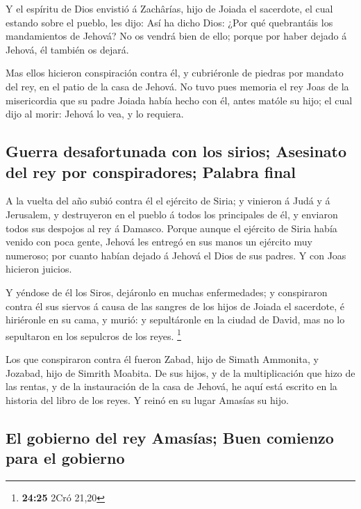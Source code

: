  Y el espíritu de Dios envistió á Zachârías, hijo de Joiada
el sacerdote, el cual estando sobre el pueblo, les dijo: Así ha dicho
Dios: ¿Por qué quebrantáis los mandamientos de Jehová? No os vendrá bien
de ello; porque por haber dejado á Jehová, él también os dejará.

 Mas ellos hicieron conspiración contra él, y cubriéronle
de piedras por mandato del rey, en el patio de la casa de Jehová.
 No tuvo pues memoria el rey Joas de la misericordia que su
padre Joiada había hecho con él, antes matóle su hijo; el cual dijo al
morir: Jehová lo vea, y lo requiera.

\hypertarget{guerra-desafortunada-con-los-sirios-asesinato-del-rey-por-conspiradores-palabra-final}{%
\subsection{Guerra desafortunada con los sirios; Asesinato del rey por
conspiradores; Palabra
final}\label{guerra-desafortunada-con-los-sirios-asesinato-del-rey-por-conspiradores-palabra-final}}

 A la vuelta del año subió contra él el ejército de Siria;
y vinieron á Judá y á Jerusalem, y destruyeron en el pueblo á todos los
principales de él, y enviaron todos sus despojos al rey á Damasco.
 Porque aunque el ejército de Siria había venido con poca
gente, Jehová les entregó en sus manos un ejército muy numeroso; por
cuanto habían dejado á Jehová el Dios de sus padres. Y con Joas hicieron
juicios.

 Y yéndose de él los Siros, dejáronlo en muchas
enfermedades; y conspiraron contra él sus siervos á causa de las sangres
de los hijos de Joiada el sacerdote, é hiriéronle en su cama, y murió: y
sepultáronle en la ciudad de David, mas no lo sepultaron en los
sepulcros de los reyes. \footnote{\textbf{24:25} 2Cró 21,20}

 Los que conspiraron contra él fueron Zabad, hijo de Simath
Ammonita, y Jozabad, hijo de Simrith Moabita.  De sus
hijos, y de la multiplicación que hizo de las rentas, y de la
instauración de la casa de Jehová, he aquí está escrito en la historia
del libro de los reyes. Y reinó en su lugar Amasías su hijo.

\hypertarget{el-gobierno-del-rey-amasuxedas-buen-comienzo-para-el-gobierno}{%
\subsection{El gobierno del rey Amasías; Buen comienzo para el
gobierno}\label{el-gobierno-del-rey-amasuxedas-buen-comienzo-para-el-gobierno}}


